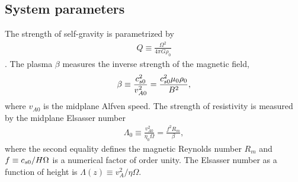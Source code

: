 \subsection{System parameters}
The strength of self-gravity is parametrized by
\begin{align}
  Q \equiv \frac{\Omega^2}{4\pi G\rho_0}
\end{align}
\citep{mamat10}. The plasma $\beta$ measures the inverse strength of
the magnetic field,
\begin{align}
  \beta \equiv \frac{c_{s0}^2}{v_{A0}^2} =
  \frac{c_{s0}^2\mu_0\rho_0}{B^2},  
\end{align}
where $v_{A0}$ is the midplane Alfven speed. The strength of
resistivity is measured by the midplane Elsasser number 
\begin{align}
  \Lambda_0 \equiv \frac{v_{A0}^2}{\eta_0\Omega} = \frac{f^2 R_m}{\beta}, 
\end{align}
where the second equality defines the magnetic Reynolds number $R_m$
and $f\equiv c_{s0}/H\Omega$ is a numerical factor of order unity.
The Elsasser number as a function of height is $\Lambda(z)\equiv
v_A^2/\eta\Omega$. 



